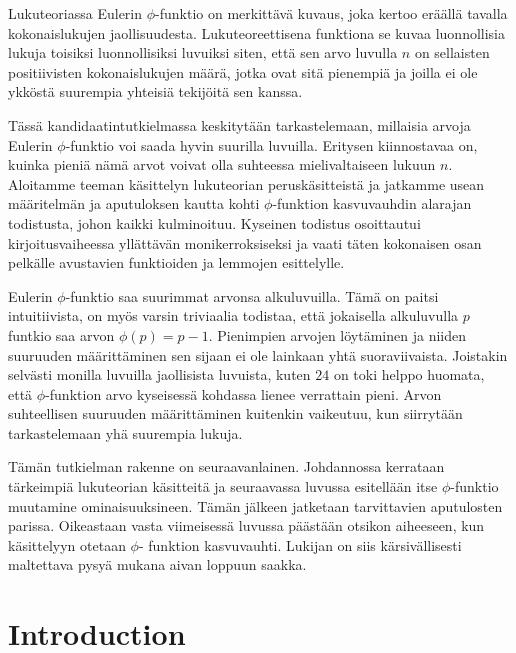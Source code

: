 \documentclass{article}
\begin{document}
\begin{otherlanguage}{finnish}

Lukuteoriassa Eulerin $\phi$-funktio on merkittävä kuvaus, joka kertoo eräällä taval\-la kokonaislukujen jaollisuudesta. Lukuteoreettisena funktiona se kuvaa luonnollisia lukuja toisiksi luonnollisiksi luvuiksi siten, että sen arvo luvulla $n$ on sellaisten positiivisten kokonaislukujen määrä, jotka ovat sitä pienempiä ja joilla ei ole ykköstä suurempia yhteisiä tekijöitä sen kanssa.

Tässä kandidaatintutkielmassa keskitytään tarkastelemaan, millaisia arvoja Eulerin $\phi$-funktio voi saada hyvin suurilla luvuilla. Eritysen kiinnostavaa on, kuinka pieniä nämä arvot voivat olla suhteessa mielivaltaiseen lukuun $n$. Aloitamme teeman käsittelyn lukuteorian peruskäsitteistä ja jatkamme usean määritelmän ja aputuloksen kautta kohti $\phi$-funktion kasvuvauhdin alarajan todistusta, johon kaikki kulminoituu. Kyseinen todistus osoittautui kirjoitusvaiheessa yllättävän monikerroksiseksi ja vaati täten kokonaisen osan pelkälle avustavien funktioiden ja lemmojen esittelylle.

Eulerin $\phi$-funktio saa suurimmat arvonsa alkuluvuilla. Tämä on paitsi intuitiivista, on myös varsin triviaalia todistaa, että jokaisella alkuluvulla $p$ funtkio saa arvon $\phi(p)=p-1$. Pienimpien arvojen löytäminen ja niiden suuruuden määrittäminen sen sijaan ei ole lainkaan yhtä suoraviivaista. Joistakin selvästi monilla luvuilla jaollisista luvuista, kuten $24$ on toki helppo huomata, että $\phi$-funktion arvo kyseisessä kohdassa lienee verrattain pieni. Arvon suhteellisen suuruuden määrittäminen kuitenkin vaikeutuu, kun siirrytään tarkastelemaan yhä suurempia lukuja.

Tämän tutkielman rakenne on seuraavanlainen. Johdannossa kerrataan tärkeimpiä lukuteorian käsitteitä ja seuraavassa luvussa esitellään itse $\phi$-funktio muutamine ominaisuuksineen. Tämän jälkeen jatketaan tarvittavien aputulosten parissa. Oikeastaan vasta viimeisessä luvussa päästään otsikon aiheeseen, kun käsittelyyn otetaan $\phi$- funktion kasvuvauhti. Lukijan on siis kärsivällisesti maltettava pysyä mukana aivan loppuun saakka.

\end{otherlanguage}

\clearpage

\section{Introduction}
\end{document}
